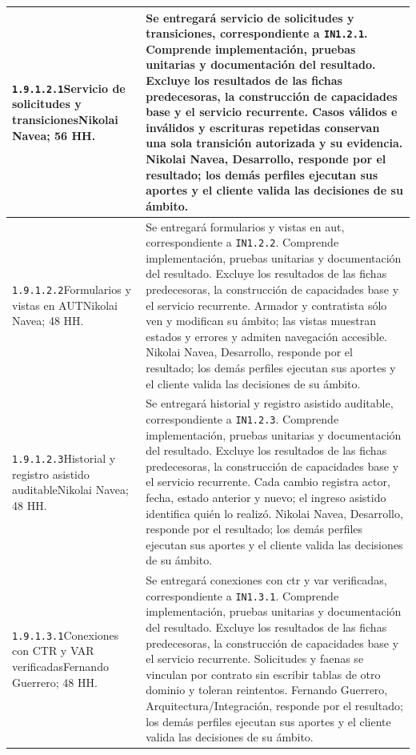 \begin{longtable}{L{52mm}L{91mm}}
\texttt{1.\allowbreak{}9.\allowbreak{}1.\allowbreak{}2.\allowbreak{}1}\newline Servicio de solicitudes y transiciones\newline Nikolai Navea; 56 HH. & Se entregará servicio de solicitudes y transiciones, correspondiente a \texttt{IN1.2.1}. Comprende implementación, pruebas unitarias y documentación del resultado. Excluye los resultados de las fichas predecesoras, la construcción de capacidades base y el servicio recurrente.  Casos válidos e inválidos y escrituras repetidas conservan una sola transición autorizada y su evidencia. Nikolai Navea, Desarrollo, responde por el resultado; los demás perfiles ejecutan sus aportes y el cliente valida las decisiones de su ámbito.\\\hline
\texttt{1.\allowbreak{}9.\allowbreak{}1.\allowbreak{}2.\allowbreak{}2}\newline Formularios y vistas en AUT\newline Nikolai Navea; 48 HH. & Se entregará formularios y vistas en aut, correspondiente a \texttt{IN1.2.2}. Comprende implementación, pruebas unitarias y documentación del resultado. Excluye los resultados de las fichas predecesoras, la construcción de capacidades base y el servicio recurrente.  Armador y contratista sólo ven y modifican su ámbito; las vistas muestran estados y errores y admiten navegación accesible. Nikolai Navea, Desarrollo, responde por el resultado; los demás perfiles ejecutan sus aportes y el cliente valida las decisiones de su ámbito.\\\hline
\texttt{1.\allowbreak{}9.\allowbreak{}1.\allowbreak{}2.\allowbreak{}3}\newline Historial y registro asistido auditable\newline Nikolai Navea; 48 HH. & Se entregará historial y registro asistido auditable, correspondiente a \texttt{IN1.2.3}. Comprende implementación, pruebas unitarias y documentación del resultado. Excluye los resultados de las fichas predecesoras, la construcción de capacidades base y el servicio recurrente.  Cada cambio registra actor, fecha, estado anterior y nuevo; el ingreso asistido identifica quién lo realizó. Nikolai Navea, Desarrollo, responde por el resultado; los demás perfiles ejecutan sus aportes y el cliente valida las decisiones de su ámbito.\\\hline
\texttt{1.\allowbreak{}9.\allowbreak{}1.\allowbreak{}3.\allowbreak{}1}\newline Conexiones con CTR y VAR verificadas\newline Fernando Guerrero; 48 HH. & Se entregará conexiones con ctr y var verificadas, correspondiente a \texttt{IN1.3.1}. Comprende implementación, pruebas unitarias y documentación del resultado. Excluye los resultados de las fichas predecesoras, la construcción de capacidades base y el servicio recurrente.  Solicitudes y faenas se vinculan por contrato sin escribir tablas de otro dominio y toleran reintentos. Fernando Guerrero, Arquitectura/Integración, responde por el resultado; los demás perfiles ejecutan sus aportes y el cliente valida las decisiones de su ámbito.\\\hline

\end{longtable}
